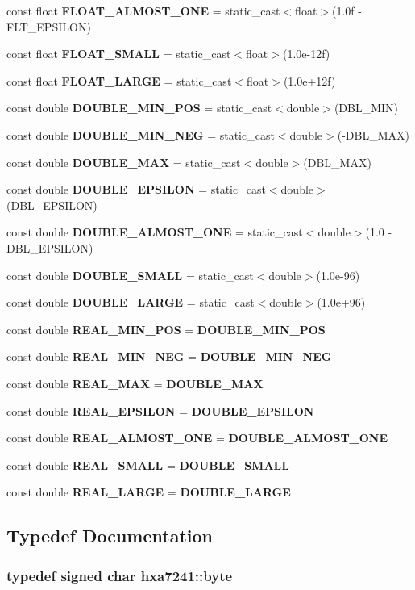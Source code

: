 \begin{CompactItemize}
\item 
const float {\bf FLOAT\_\-ALMOST\_\-ONE} = static\_\-cast$<$float$>$(1.0f - FLT\_\-EPSILON)
\item 
const float {\bf FLOAT\_\-SMALL} = static\_\-cast$<$float$>$(1.0e-12f)
\item 
const float {\bf FLOAT\_\-LARGE} = static\_\-cast$<$float$>$(1.0e+12f)
\item 
const double {\bf DOUBLE\_\-MIN\_\-POS} = static\_\-cast$<$double$>$(DBL\_\-MIN)
\item 
const double {\bf DOUBLE\_\-MIN\_\-NEG} = static\_\-cast$<$double$>$(-DBL\_\-MAX)
\item 
const double {\bf DOUBLE\_\-MAX} = static\_\-cast$<$double$>$(DBL\_\-MAX)
\item 
const double {\bf DOUBLE\_\-EPSILON} = static\_\-cast$<$double$>$(DBL\_\-EPSILON)
\item 
const double {\bf DOUBLE\_\-ALMOST\_\-ONE} = static\_\-cast$<$double$>$(1.0 - DBL\_\-EPSILON)
\item 
const double {\bf DOUBLE\_\-SMALL} = static\_\-cast$<$double$>$(1.0e-96)
\item 
const double {\bf DOUBLE\_\-LARGE} = static\_\-cast$<$double$>$(1.0e+96)
\item 
const double {\bf REAL\_\-MIN\_\-POS} = {\bf DOUBLE\_\-MIN\_\-POS}
\item 
const double {\bf REAL\_\-MIN\_\-NEG} = {\bf DOUBLE\_\-MIN\_\-NEG}
\item 
const double {\bf REAL\_\-MAX} = {\bf DOUBLE\_\-MAX}
\item 
const double {\bf REAL\_\-EPSILON} = {\bf DOUBLE\_\-EPSILON}
\item 
const double {\bf REAL\_\-ALMOST\_\-ONE} = {\bf DOUBLE\_\-ALMOST\_\-ONE}
\item 
const double {\bf REAL\_\-SMALL} = {\bf DOUBLE\_\-SMALL}
\item 
const double {\bf REAL\_\-LARGE} = {\bf DOUBLE\_\-LARGE}
\end{CompactItemize}


\subsection{Typedef Documentation}
\subsubsection{\setlength{\rightskip}{0pt plus 5cm}typedef signed char {\bf hxa7241::byte}}\label{namespacehxa7241_f9f106c86bb3c811a94166a414427ab4}


